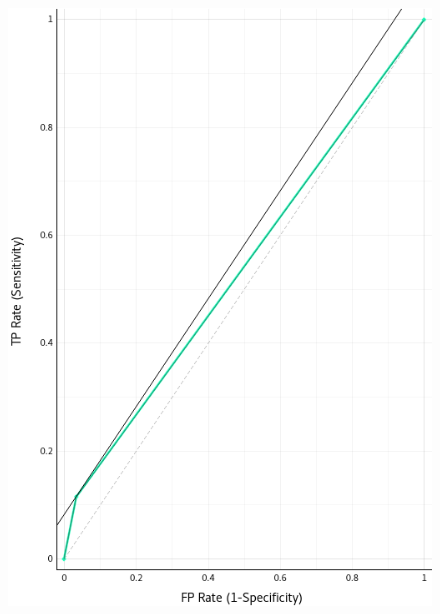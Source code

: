 \begin{figure}[H]
\begin{center}
    \includegraphics{figuras/roc_2-0.png}
\end{center}
\caption{}
\label{fig:class_2.00}
\end{figure}

